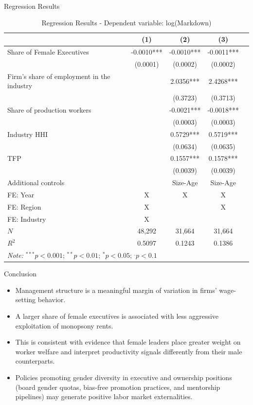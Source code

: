 \documentclass[11pt,aspectratio=169]{beamer}
\begin{document}
\begin{frame}{Regression Results}
\vspace{-0.8em}
\begin{table}
\centering
\footnotesize
\caption{Regression Results - Dependent variable: log(Markdown)}
\begin{tabular}{lcccc}
\hline
 & (1) & (2) & (3) \\
\hline
Share of Female Executives & -0.0010*** & -0.0010*** & -0.0011*** \\
 & (0.0001) & (0.0002) & (0.0002) \\
Firm's share of employment in the industry &  & 2.0356*** & 2.4268*** \\
 &  & (0.3723) & (0.3713) \\
Share of production workers &  & -0.0021*** & -0.0018*** \\
 &  & (0.0003) & (0.0003) \\
Industry HHI &  & 0.5729*** & 0.5719*** \\
 &  & (0.0634) & (0.0635) \\
TFP &  & 0.1557*** & 0.1578*** \\
 &  & (0.0039) & (0.0039)\\
\hline
Additional controls &  & Size-Age & Size-Age\\
FE: Year & X & X & X\\
FE: Region & X &  & X \\
FE: Industry & X &  &  \\
\hline
$N$ & 48,292 & 31,664 & 31,664 \\
$R^{2}$ & 0.5097 & 0.1243 & 0.1386 \\
\hline
\multicolumn{4}{l}{\textit{Note:} $^{***}p<0.001$; $^{**}p<0.01$; $^{*}p<0.05$; $^{.}p<0.1$} \\
\end{tabular}
\end{table}

\end{frame}

\begin{frame}{Conclusion}
\begin{itemize}
  \item Management structure is a meaningful margin of variation in firms' wage-setting behavior.
  \item A larger share of female executives is associated with less aggressive exploitation of monopsony rents.
  \item This is consistent with evidence that female leaders place greater weight on worker welfare and interpret productivity signals differently from their male counterparts.
  \item Policies promoting gender diversity in executive and ownership positions (board gender quotas, bias-free promotion practices, and mentorship pipelines) may generate positive labor market externalities.
\end{itemize}
\end{frame}
\end{document}
